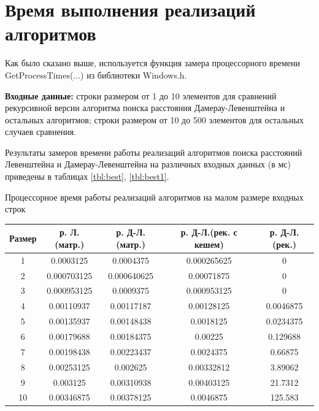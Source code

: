 \section{Время выполнения реализаций алгоритмов}

Как было сказано выше, используется функция замера процессорного времени GetProcessTimes(...) из библиотеки Windows.h. 

\textbf{Входные данные:} строки размером от 1 до 10 элементов для сравнений рекурсивной версии алгоритма поиска расстояния Дамерау-Левенштейна и остальных алгоритмов; строки размером от 10 до 500 элементов для остальных случаев сравнения.

Результаты замеров времени работы реализаций алгоритмов поиска расстояний Левенштейна и Дамерау-Левенштейна на различных входных данных (в мс) приведены в таблицах \ref{tbl:best}, \ref{tbl:best1}.
\begin{center}
	\begin{threeparttable}
		\caption{Процессорное время работы реализаций алгоритмов на малом размере входных строк}
		\label{tbl:best}
		\begin{tabular}{|c|c|c|c|c|}
			\hline
			Размер &р. Л.(матр.) &р. Д-Л.(матр.)  &р. Д-Л.(рек. с кешем)& р. Д-Л.(рек.)\\
			\hline
			1 &  0.0003125  &    0.0004375    &0.000265625 &             0\\
			\hline
			2 &  0.000703125 &   0.000640625    & 0.00071875&              0\\
		\hline
			3 &  0.000953125  &    0.0009375   & 0.000953125 &             0\\
		\hline
			4 & 0.00110937     &0.00117187    & 0.00128125    &  0.0046875\\
		\hline
			5 &  0.00135937     &0.00148438      &0.0018125    &  0.0234375\\
		\hline
			6 & 0.00179688 &    0.00184375      &  0.00225      & 0.129688\\
		\hline
			7 &  0.00198438 &    0.00223437    &  0.0024375      &  0.66875\\
		\hline
			8 & 0.00253125   &    0.002625    & 0.00332812        &3.89062\\
		\hline
			9 & 0.003125 &    0.00310938     &0.00403125      &  21.7312\\
		\hline
			10 & 0.00346875 &    0.00378125 &     0.0046875    &    125.583\\
		\hline
		\end{tabular}
		
	\end{threeparttable}
\end{center}

